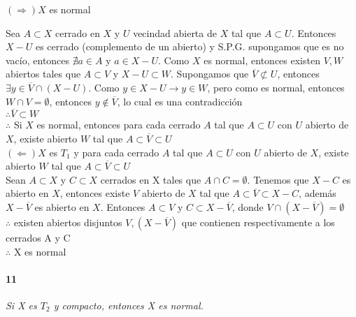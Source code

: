 \documentclass[12pt]{article}
\begin{document}
$(\Rightarrow ) X$ es normal 

Sea $A\subset X$ cerrado en $X$ y $U$ vecindad abierta de $X$ tal que $A\subset U$. Entonces $X-U$ es cerrado (complemento de un abierto) y S.P.G. supongamos que es no vacío, entonces $\nexists a\in A$ y $a\in X-U$. Como $X$ es normal, entonces existen $V,W$ abiertos tales que $A \subset V$ y $X-U\subset W$. Supongamos que $\overline{V}\not \subset U$, entonces $\exists y \in \overline{V}\cap(X-U)$. Como $y\in X-U \rightarrow y\in W$, pero como es normal, entonces $W \cap V=\emptyset$, entonces $y\notin \overline{V}$, lo cual es una contradicción
\\ $\therefore \overline{V}\subset W$
\\ $\therefore$ Si $X$ es normal, entonces para cada cerrado $A$ tal que $A \subset U$ con $U$ abierto de $X$, existe abierto $W$ tal que $A \subset \overline{V} \subset U$
\\$(\Leftarrow) X$ es $T_1$ y para cada cerrado $A$ tal que $A \subset U$ con $U$ abierto de $X$, existe abierto $W$ tal que $A \subset \overline{V} \subset U$
\\Sean $A\subset X$ y $C \subset X$ cerrados en X tales que $A \cap C =\emptyset$. Tenemos que $X-C$ es abierto en $X$, entonces existe $V$ abierto de $X$ tal que $A\subset \overline{V} \subset X-C$, además $X-\overline{V}$ es abierto en $X$. Entonces $A \subset V$ y $C \subset X-\overline{V}$, donde $V\cap(X-\overline{V})=\emptyset$
\\$\therefore$ existen abiertos disjuntos $V, (X-\overline{V})$ que contienen respectivamente a los cerrados A y C
\\$\therefore$ X es normal

\paragraph{11}
\textit{Si X es $T_2$ y compacto, entonces X es normal.}
\end{document}
